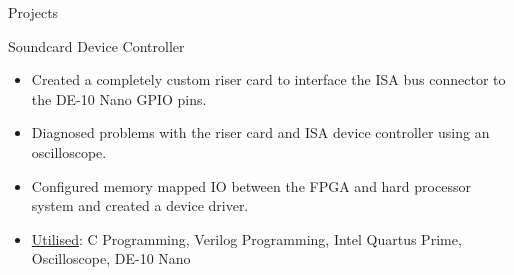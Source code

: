 \documentclass[]{mcdowellcv}
\begin{document}
\begin{cvsection}{Projects}
\begin{cvsubsection}{Soundcard Device Controller}{}{}
\begin{itemize}
				\item Created a completely custom riser card to interface the ISA bus connector to the DE-10 Nano GPIO pins.
				\item Diagnosed problems with the riser card and ISA device controller using an oscilloscope.
				\item Configured memory mapped IO between the FPGA and hard processor system and created a device driver.
				\item \underline{Utilised}: C Programming, Verilog Programming, Intel Quartus Prime, Oscilloscope, DE-10 Nano
			\end{itemize}
		\end{cvsubsection}
\iffalse
-In a pair, designed and developed an ISA device controller for the Sound Blaster 16 sound card for the DE-10 Nano SoC.
-A custom riser card was created to interface the ISA bus connector on the sound card to the DE-10 Nano GPIO pins.
-The controller itself was written in Verilog and deployed on the DE-10 Nano FPGA, this consisted of write, read and configuration registers, as well as logic to match the specific timing requirements of the ISA standard.
-Intel Quartus Prime was utilised to memory map the controller registers to the hard processor system, allowing us to write and read from the card transparently through a basic custom driver.
\fi

\iffalse
		\begin{cvsubsection}{Arduino LED Matrix}{}{}
			\begin{itemize}
				\item Designed and implemented a custom 8x8 LED matrix board with device driver for an Arduino Microcontroller.
				\item \underline{Utilised}: C Programming, Arduino Microcontroller, Circuit Design
			\end{itemize}
		\end{cvsubsection}
\fi

	\end{cvsection}
\end{document}
